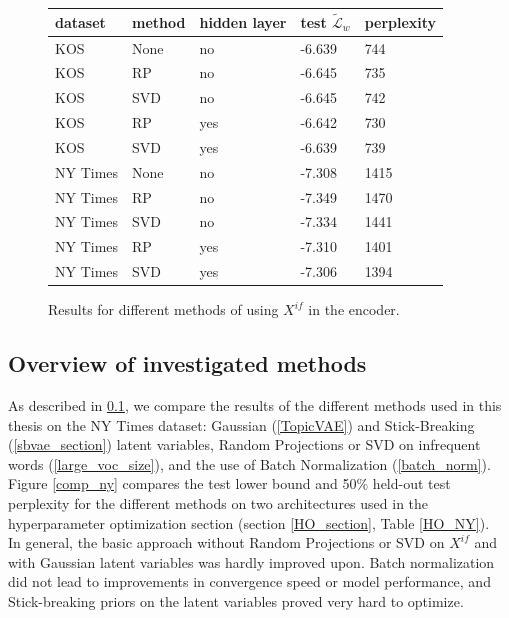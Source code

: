 \documentclass{report}
\begin{document}
	\begin{figure}
		\centering
		\begin{tabular}{l|l|l|l|l}
			dataset & method & hidden layer & test $\tilde{\mathcal{L}}_w$ & perplexity \\ \hline
			KOS	&	None	& no &	\color{red} -6.639	&	744 \\
			KOS	&	RP	&	no &-6.645	&	735 \\
			KOS&SVD&no &-6.645&742 \\
			KOS	&	RP	&	yes & -6.642	&	\color{red}730 \\
			KOS&SVD&yes &\color{red}-6.639&739 \\ \hline 
			NY Times&None&no & -7.308 & 1415\\
			NY Times&RP&no &-7.349&1470 \\
			NY Times&SVD&no &-7.334&1441 \\ 
			NY Times&RP&yes &-7.310&1401 \\
			NY Times&SVD&yes &\color{red}-7.306&\color{red}1394 \\
		\end{tabular}
		\caption{Results for different methods of using $X^{if}$ in the encoder.}
		\label{rpsvd_results}
	\end{figure}

	\subsection{Overview of investigated methods}\label{comp_methods_details}
	As described in \ref{comp_methods_details}, we compare the results of the different methods used in this thesis on the NY Times dataset: Gaussian (\ref{TopicVAE}) and Stick-Breaking (\ref{sbvae_section}) latent variables, Random Projections or SVD on infrequent words (\ref{large_voc_size}), and the use of Batch Normalization (\ref{batch_norm}). Figure \ref{comp_ny} compares the test lower bound and 50\% held-out test perplexity for the different methods on two architectures used in the hyperparameter optimization section (section \ref{HO_section}, Table \ref{HO_NY}).\\
	In general, the basic approach without Random Projections or SVD on $X^{if}$ and with Gaussian latent variables was hardly improved upon. Batch normalization did not lead to improvements in convergence speed or model performance, and Stick-breaking priors on the latent variables proved very hard to optimize.
	
\end{document}
